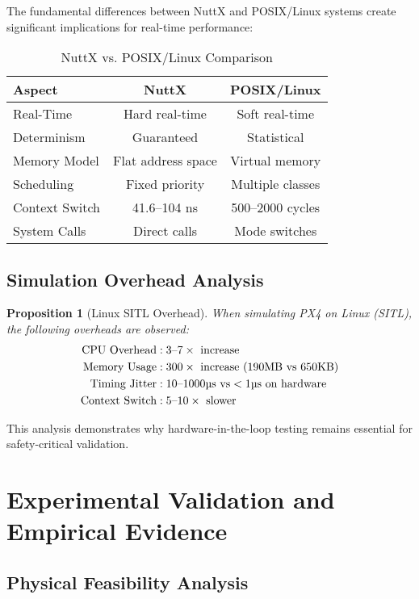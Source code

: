 \documentclass[11pt,a4paper]{article}
\newtheorem{proposition}[theorem]{Proposition}
\theoremstyle{definition}
\theoremstyle{remark}
\begin{document}
The fundamental differences between NuttX and POSIX/Linux systems create significant implications for real-time performance:

\begin{table}[h]
\centering
\caption{NuttX vs. POSIX/Linux Comparison}
\label{tab:nuttx_posix_comparison}
\begin{tabular}{lcc}
\toprule
\textbf{Aspect} & \textbf{NuttX} & \textbf{POSIX/Linux} \\
\midrule
Real-Time & Hard real-time & Soft real-time \\
Determinism & Guaranteed & Statistical \\
Memory Model & Flat address space & Virtual memory \\
Scheduling & Fixed priority & Multiple classes \\
Context Switch & 41.6--104 ns & 500--2000 cycles \\
System Calls & Direct calls & Mode switches \\
\bottomrule
\end{tabular}
\end{table}

\subsection{Simulation Overhead Analysis}

\begin{proposition}[Linux SITL Overhead]
When simulating PX4 on Linux (SITL), the following overheads are observed:
\begin{align}
\text{CPU Overhead} &: 3\text{--}7\times \text{ increase} \\
\text{Memory Usage} &: 300\times \text{ increase (190MB vs 650KB)} \\
\text{Timing Jitter} &: 10\text{--}1000\text{\textmu s vs} <1\text{\textmu s on hardware} \\
\text{Context Switch} &: 5\text{--}10\times \text{ slower}
\end{align}
\end{proposition}

This analysis demonstrates why hardware-in-the-loop testing remains essential for safety-critical validation.

\section{Experimental Validation and Empirical Evidence}

\subsection{Physical Feasibility Analysis}
\end{document}
